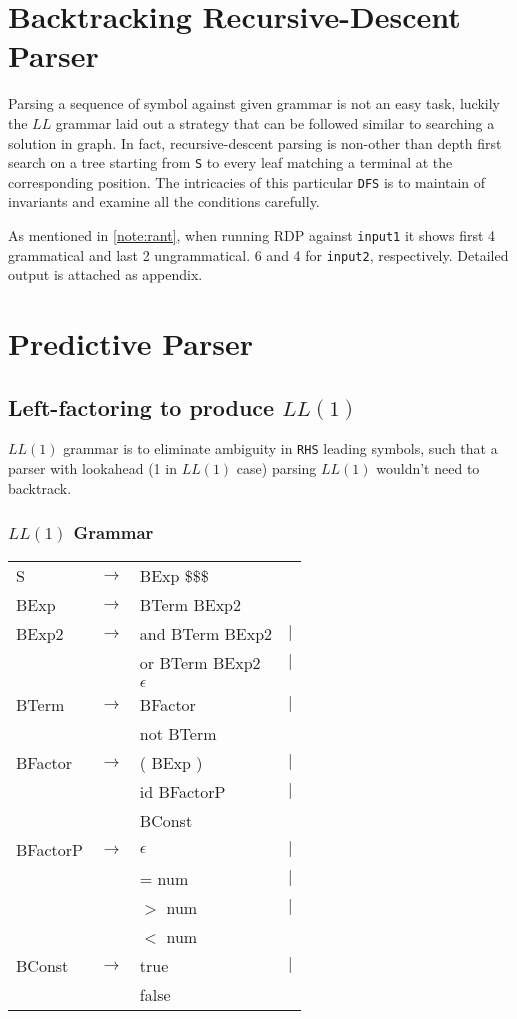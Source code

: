 \documentclass[%
 aip,
 jmp,%
 amsmath,amssymb,
 reprint,%
]{revtex4-1}
\begin{document}
\section{Backtracking Recursive-Descent Parser}
Parsing a sequence of symbol against given grammar is not an easy task, luckily the $LL$ grammar laid out a strategy that can be followed similar to searching a solution in graph. In fact, recursive-descent parsing is non-other than depth first search on a tree starting from \texttt{S} to every leaf matching a terminal at the corresponding position. The intricacies of this particular \texttt{DFS} is to maintain of invariants and examine all the conditions carefully.

As mentioned in \ref{note:rant}, when running RDP against \texttt{input1} it shows first 4 grammatical and last 2 ungrammatical. 6 and 4 for \texttt{input2}, respectively. Detailed output is attached as appendix.
\section{Predictive Parser}

\subsection{Left-factoring to produce $LL(1)$}

$LL(1)$ grammar is to eliminate ambiguity in \texttt{RHS} leading symbols, such that a parser with lookahead (1 in $LL(1)$ case) parsing $LL(1)$ wouldn't need to backtrack. 

\subsubsection{$LL(1)$ Grammar}
\begin{tabular}{lclr}
S	&$\rightarrow$& BExp \$\$\$			&\\
BExp	&$\rightarrow$& BTerm BExp2		&\\
BExp2	&$\rightarrow$& and BTerm BExp2	&$|$\\
		&&		or BTerm	 BExp2			&$|$\\
		&&		$\epsilon$				&\\
BTerm	&$\rightarrow$&	BFactor			&$|$\\
		&&		not BTerm				&\\
BFactor	&$\rightarrow$& ( BExp )			&$|$\\
		&&	   	id BFactorP				&$|$\\
		&&	   	BConst					&\\
BFactorP&$\rightarrow$&	$\epsilon$			&$|$\\
		&&		= num				&$|$\\
		&&	   	$>$ num				&$|$\\
		&&	   	$<$ num				&\\
BConst	&$\rightarrow$& true				&$|$\\
		&&	   	false					&
\end{tabular}
\end{document}
